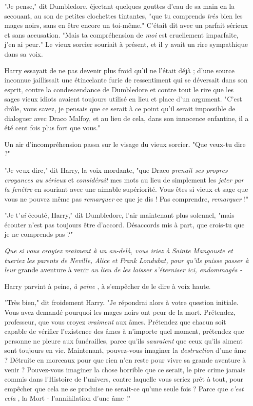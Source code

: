 "Je pense," dit Dumbledore, éjectant quelques gouttes d'eau de sa main en la secouant, au son de petites clochettes tintantes, "que tu comprends \emph{très } bien les mages noirs, sans en être encore un toi-même." C'était dit avec un parfait sérieux et sans accusation. "Mais ta compréhension de \emph{moi}  est cruellement imparfaite, j'en ai peur." Le vieux sorcier souriait à présent, et il y avait un rire sympathique dans sa voix.

Harry essayait de ne pas devenir plus froid qu'il ne l'était déjà ; d'une source inconnue jaillissait une étincelante furie de ressentiment qui se déversait dans son esprit, contre la condescendance de Dumbledore et contre tout le rire que les sages vieux idiots avaient toujours utilisé en lieu et place d'un argument. "C'est drôle, vous savez, je pensais que ce serait à ce point qu'il serait impossible de dialoguer avec Draco Malfoy, et au lieu de cela, dans son innocence enfantine, il a été cent fois plus fort que vous."

Un air d'incompréhension passa sur le visage du vieux sorcier. "Que veux-tu dire ?"

"Je veux dire," dit Harry, la voix mordante, "que Draco \emph{prenait ses propres croyances au sérieux}  et \emph{considérait}  mes mots au lieu de simplement les \emph{jeter par la fenêtre}  en souriant avec une aimable supériorité. Vous êtes si vieux et sage que vous ne pouvez même pas \emph{remarquer}  ce que je dis ! Pas comprendre, \emph{remarquer}  !"

"Je t'\emph{ai}  écouté, Harry," dit Dumbledore, l'air maintenant plus solennel, "mais écouter n'est pas toujours être d'accord. Désaccords mis à part, que crois-tu que je ne comprends pas ?"

\emph{Que si vous croyiez vraiment à un au-delà, vous iriez à Sainte Mangouste et tueriez les parents de Neville, Alice et Frank Londubat, pour qu'ils puisse passer à leur } grande aventure à venir \emph{au lieu de les laisser s'éterniser ici, endommagés -} 

Harry parvint à peine, \emph{à peine} , à s'empêcher de le dire à voix haute.

"Très bien," dit froidement Harry. "Je répondrai alors à votre question initiale. Vous avez demandé pourquoi les mages noirs ont peur de la mort. Prétendez, professeur, que vous croyez \emph{vraiment}  aux âmes. Prétendez que chacun soit capable de vérifier l'existence des âmes à n'importe quel moment, prétendez que personne ne pleure aux funérailles, parce qu'ils \emph{sauraient}  que ceux qu'ils aiment sont toujours en vie. Maintenant, pouvez-vous imaginer la \emph{destruction}  d'une âme ? Détruite en morceaux pour que rien n'en reste pour vivre sa grande aventure à venir ? Pouvez-vous imaginer la chose horrible que ce serait, le pire crime jamais commis dans l'Histoire de l'univers, contre laquelle vous seriez prêt à tout, pour empêcher que cela ne se produise ne serait-ce qu'une seule fois ? Parce que \emph{c'est cela} , la Mort - l'annihilation d'une âme !"

